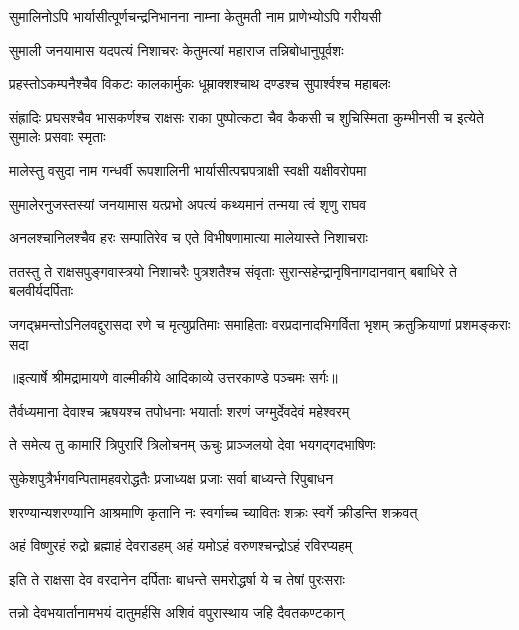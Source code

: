 \twolineshloka
{सुमालिनोऽपि भार्यासीत्पूर्णचन्द्रनिभानना}
{नाम्ना केतुमती नाम प्राणेभ्योऽपि गरीयसी} %

\twolineshloka
{सुमाली जनयामास यदपत्यं निशाचरः}
{केतुमत्यां महाराज तन्निबोधानुपूर्वशः} %

\twolineshloka
{प्रहस्तोऽकम्पनैश्चैव विकटः कालकार्मुकः}
{धूम्राक्शश्चाथ दण्डश्च सुपार्श्वश्च महाबलः} %

\threelineshloka
{संह्रादिः प्रघसश्चैव भासकर्णश्च राक्षसः}
{राका पुष्पोत्कटा चैव कैकसी च शुचिस्मिता}
{कुम्भीनसी च इत्येते सुमालेः प्रसवाः स्मृताः} %

\twolineshloka
{मालेस्तु वसुदा नाम गन्धर्वी रूपशालिनी}
{भार्यासीत्पद्मपत्राक्षी स्वक्षी यक्षीवरोपमा} %

\twolineshloka
{सुमालेरनुजस्तस्यां जनयामास यत्प्रभो}
{अपत्यं कथ्यमानं तन्मया त्वं शृणु राघव} %

\twolineshloka
{अनलश्चानिलश्चैव हरः सम्पातिरेव च}
{एते विभीषणामात्या मालेयास्ते निशाचराः} %

\fourlineindentedshloka
{ततस्तु ते राक्षसपुङ्गवास्त्रयो}
{निशाचरैः पुत्रशतैश्च संवृताः}
{सुरान्सहेन्द्रानृषिनागदानवान्}
{बबाधिरे ते बलवीर्यदर्पिताः} %

\fourlineindentedshloka
{जगद्भ्रमन्तोऽनिलवद्दुरासदा}
{रणे च मृत्युप्रतिमाः समाहिताः}
{वरप्रदानादभिगर्विता भृशम्}
{क्रतुक्रियाणां प्रशमङ्कराः सदा} %


{॥इत्यार्षे श्रीमद्रामायणे वाल्मीकीये आदिकाव्ये उत्तरकाण्डे पञ्चमः सर्गः॥}


\twolineshloka
{तैर्वध्यमाना देवाश्च ऋषयश्च तपोधनाः}
{भयार्ताः शरणं जग्मुर्देवदेवं महेश्वरम्} %

\twolineshloka
{ते समेत्य तु कामारिं त्रिपुरारिं त्रिलोचनम्}
{ऊचुः प्राञ्जलयो देवा भयगद्गदभाषिणः} %

\twolineshloka
{सुकेशपुत्रैर्भगवन्पितामहवरोद्धतैः}
{प्रजाध्यक्ष प्रजाः सर्वा बाध्यन्ते रिपुबाधन} %

\twolineshloka
{शरण्यान्यशरण्यानि आश्रमाणि कृतानि नः}
{स्वर्गाच्च च्यावितः शक्रः स्वर्गे क्रीडन्ति शक्रवत्} %

\twolineshloka
{अहं विष्णुरहं रुद्रो ब्रह्माहं देवराडहम्}
{अहं यमोऽहं वरुणश्चन्द्रोऽहं रविरप्यहम्} %

\twolineshloka
{इति ते राक्षसा देव वरदानेन दर्पिताः}
{बाधन्ते समरोद्धर्षा ये च तेषां पुरःसराः} %

\twolineshloka
{तन्नो देवभयार्तानामभयं दातुमर्हसि}
{अशिवं वपुरास्थाय जहि दैवतकण्टकान्} %

